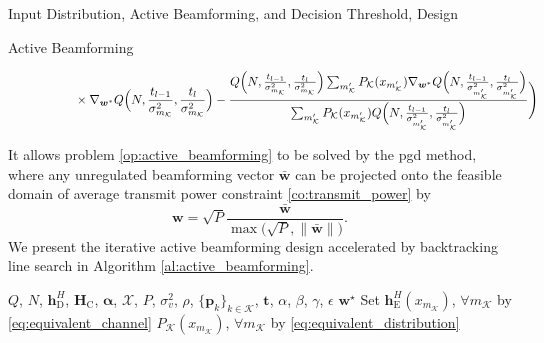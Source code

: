 \documentclass[journal]{IEEEtran}
\begin{document}
\begin{section}{Input Distribution, Active Beamforming, and Decision Threshold, Design}
\begin{subsection}{Active Beamforming}
\begin{figure}[!b]
\begin{align}
				 & \qquad \times \nabla_{\boldsymbol{w}^*} Q\Bigl(N,\frac{t_{l-1}}{\sigma_{m_{\mathcal{K}}}^2},\frac{t_l}{\sigma_{m_{\mathcal{K}}}^2}\Bigr)-\frac{Q\Bigl(N,\frac{t_{l-1}}{\sigma_{m_{\mathcal{K}}}^2},\frac{t_l}{\sigma_{m_{\mathcal{K}}}^2}\Bigr)\sum_{m_{\mathcal{K}}'}P_{\mathcal{K}}(x_{m_{\mathcal{K}}'})\nabla_{\boldsymbol{w}^*}Q\Bigl(N,\frac{t_{l-1}}{\sigma_{m_{\mathcal{K}}'}^2},\frac{t_l}{\sigma_{m_{\mathcal{K}}'}^2}\Bigr)}{\sum_{m_{\mathcal{K}}'}P_{\mathcal{K}}(x_{m_{\mathcal{K}}'})Q\Bigl(N,\frac{t_{l-1}}{\sigma_{m_{\mathcal{K}}'}^2},\frac{t_l}{\sigma_{m_{\mathcal{K}}'}^2}\Bigr)}\Biggr)
				\label{eq:weighted_sum_mutual_information_gradient}
			\end{align}
		\end{figure}
		It allows problem \eqref{op:active_beamforming} to be solved by the \gls{pgd} method, where any unregulated beamforming vector $\bar{\boldsymbol{w}}$ can be projected onto the feasible domain of average transmit power constraint \eqref{co:transmit_power} by
		\begin{equation}
			\boldsymbol{w} = \sqrt{P} \frac{\bar{\boldsymbol{w}}}{\max\bigl(\sqrt{P},\lVert\bar{\boldsymbol{w}}\rVert\bigr)}.
			\label{eq:beamforming_projection}
		\end{equation}
		We present the iterative active beamforming design accelerated by backtracking line search in Algorithm \ref{al:active_beamforming}.
		\begin{algorithm}[!t]
			\caption{Iterative Active Beamforming Design by \gls{pgd} with Backtracking Line Search}
			\label{al:active_beamforming}
			\begin{algorithmic}[1]
				\Require $Q$, $N$, $\boldsymbol{h}_{\mathrm{D}}^H$, $\boldsymbol{H}_{\mathrm{C}}$, $\boldsymbol{\alpha}$, $\mathcal{X}$, $P$, $\sigma_v^2$, $\rho$, $\{\boldsymbol{p}_k\}_{k \in \mathcal{K}}$, $\boldsymbol{t}$, $\alpha$, $\beta$, $\gamma$, $\epsilon$
				\Ensure $\boldsymbol{w}^\star$
				\State Set $\boldsymbol{h}_{\mathrm{E}}^H(x_{m_{\mathcal{K}}})$, $\forall m_{\mathcal{K}}$ by \eqref{eq:equivalent_channel}
				\State \phantom{Set} $P_{\mathcal{K}}(x_{m_{\mathcal{K}}})$, $\forall m_{\mathcal{K}}$ by \eqref{eq:equivalent_distribution}

\end{algorithmic}
\end{algorithm}
\end{subsection}
\end{section}
\end{document}
